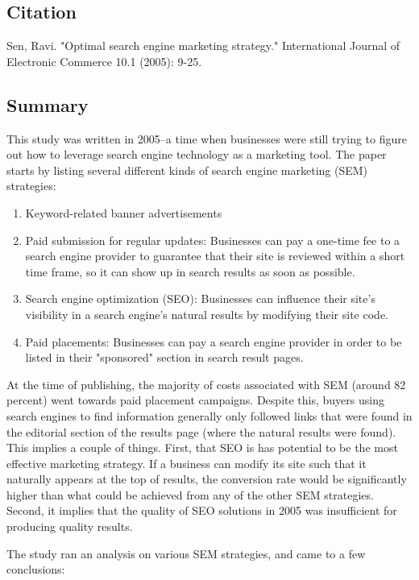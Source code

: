 \documentclass[../summaries.tex]{subfiles}
\begin{document}
\subsection{Citation}
Sen, Ravi. "Optimal search engine marketing strategy." International Journal of Electronic Commerce 10.1 (2005): 9-25.

\subsection{Summary}
This study was written in 2005--a time when businesses were still trying to figure out how to leverage search engine technology as a marketing tool. The paper starts by listing several different kinds of search engine marketing (SEM) strategies:

\begin{enumerate}
\item Keyword-related banner advertisements
\item Paid submission for regular updates: Businesses can pay a one-time fee to a search engine provider to guarantee that their site is reviewed within a short time frame, so it can show up in search results as soon as possible.
\item Search engine optimization (SEO): Businesses can influence their site's visibility in a search engine's natural results by modifying their site code.
\item Paid placements: Businesses can pay a search engine provider in order to be listed in their "sponsored" section in search result pages.
\end{enumerate}

At the time of publishing, the majority of costs associated with SEM (around 82 percent) went towards paid placement campaigns. Despite this, buyers using search engines to find information generally only followed links that were found in the editorial section of the results page (where the natural results were found). This implies a couple of things. First, that SEO is has potential to be the most effective marketing strategy. If a business can modify its site such that it naturally appears at the top of results, the conversion rate would be significantly higher than what could be achieved from any of the other SEM strategies. Second, it implies that the quality of SEO solutions in 2005 was insufficient for producing quality results.

The study ran an analysis on various SEM strategies, and came to a few conclusions:
\end{document}
